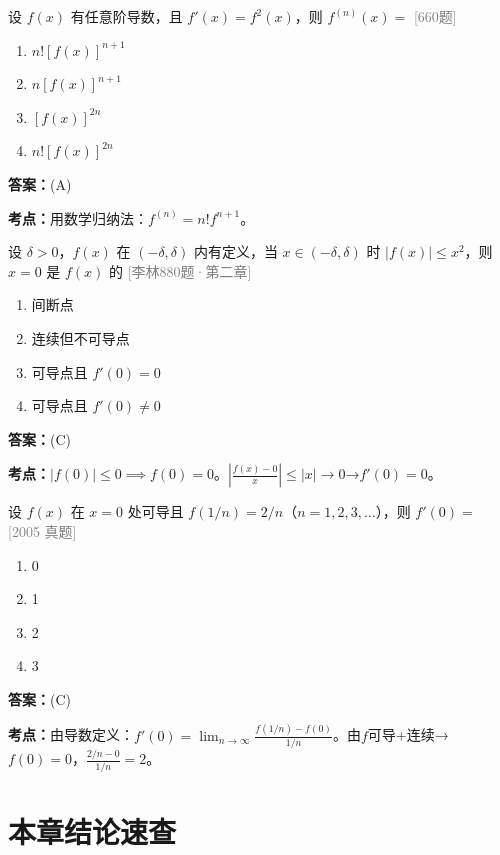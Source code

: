 \documentclass[12pt,a4paper]{ctexbook}
\newcommand{\src}[1]{\hfill\textcolor{gray}{\small\textsf{[#1]}}}
\newcommand{\ans}[1]{\begin{answerbox}\textbf{答案：}#1\end{answerbox}}
\newcommand{\kpt}[1]{\textbf{考点：}#1}
\begin{document}
\bigskip

\begin{exercise}[660题·高阶导数递推]
设 $f(x)$ 有任意阶导数，且 $f'(x)=f^2(x)$，则 $f^{(n)}(x)=$ \hfill\src{660题}
\begin{enumerate}[label=(\Alph*),nosep]
  \item $n![f(x)]^{n+1}$
  \item $n[f(x)]^{n+1}$
  \item $[f(x)]^{2n}$
  \item $n![f(x)]^{2n}$
\end{enumerate}
\end{exercise}
\ans{(A)}
\kpt{用数学归纳法：$f^{(n)}=n!f^{n+1}$。}

\bigskip

\begin{exercise}[880题·利用不等式判定可导性]
设 $\delta>0$，$f(x)$ 在 $(-\delta,\delta)$ 内有定义，当 $x\in(-\delta,\delta)$ 时 $|f(x)|\leqslant x^2$，则 $x=0$ 是 $f(x)$ 的 \hfill\src{李林880题·第二章}
\begin{enumerate}[label=(\Alph*),nosep]
  \item 间断点
  \item 连续但不可导点
  \item 可导点且 $f'(0)=0$
  \item 可导点且 $f'(0)\neq 0$
\end{enumerate}
\end{exercise}
\ans{(C)}
\kpt{$|f(0)|\leqslant 0\implies f(0)=0$。$|\frac{f(x)-0}{x}|\leqslant |x|\to 0$→$f'(0)=0$。}

\bigskip

\begin{exercise}[660题·2005 导数定义极限]
设 $f(x)$ 在 $x=0$ 处可导且 $f(1/n)=2/n$（$n=1,2,3,\ldots$），则 $f'(0)=$ \hfill\src{2005 真题}
\begin{enumerate}[label=(\Alph*),nosep]
  \item 0
  \item 1
  \item 2
  \item 3
\end{enumerate}
\end{exercise}
\ans{(C)}
\kpt{由导数定义：$f'(0)=\lim_{n\to\infty}\frac{f(1/n)-f(0)}{1/n}$。由$f$可导+连续→$f(0)=0$，$\frac{2/n-0}{1/n}=2$。}

\section{本章结论速查}
\end{document}
